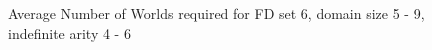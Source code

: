 \begin{figure}
\begin{minipage}{7cm}
\centerline{}
\caption{\label{graph:4.12w} {Average Number of Worlds
Required for FD set 6, domain size 3 - 9, indefinite arity 2}}
\end{minipage}
\hfill
\begin{minipage}{7cm}
\centerline{}
\caption{\label{graph:4.13w} {Average Number of Worlds required 
for FD set 6, domain size 5 - 9, indefinite arity 4 - 6}}
\end{minipage}
\end{figure}





